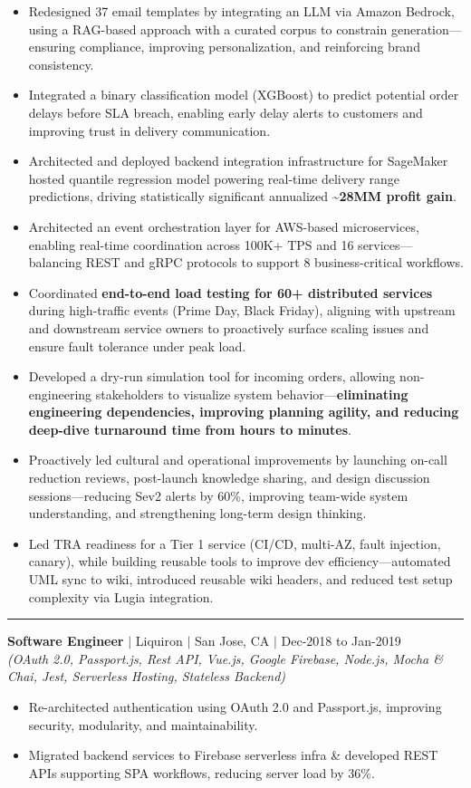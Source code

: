 \documentclass[10pt,letterpaper]{article}
\newcommand{\resumeItem}[1]{\item \small{#1}}
\newcommand{\role}[4]{
  \vspace{1.5pt}
  \textbf{#1} $|$ #2 $|$ #3 $|$ #4\\[-2pt]
}
\newcommand{\tech}[1]{\small\textit{(#1)}\vspace{1.5pt}}
\begin{document}
\begin{itemize}
    \resumeItem{Redesigned 37 email templates by integrating an LLM via Amazon Bedrock, using a RAG-based approach with a curated corpus to constrain generation---ensuring compliance, improving personalization, and reinforcing brand consistency.}
    \resumeItem{Integrated a binary classification model (XGBoost) to predict potential order delays before SLA breach, enabling early delay alerts to customers and improving trust in delivery communication.}
    \resumeItem{Architected and deployed backend integration infrastructure for SageMaker hosted quantile regression model powering real-time delivery range predictions, driving statistically significant annualized \textbf{\textasciitilde{}28MM profit gain}.}
    \resumeItem{Architected an event orchestration layer for AWS-based microservices, enabling real-time coordination across 100K+ TPS and 16 services---balancing REST and gRPC protocols to support 8 business-critical workflows.}
    \resumeItem{Coordinated \textbf{end-to-end load testing for 60+ distributed services} during high-traffic events (Prime Day, Black Friday), aligning with upstream and downstream service owners to proactively surface scaling issues and ensure fault tolerance under peak load.}
    \resumeItem{Developed a dry-run simulation tool for incoming orders, allowing non-engineering stakeholders to visualize system behavior---\textbf{eliminating engineering dependencies, improving planning agility, and reducing deep-dive turnaround time from hours to minutes}.}
    \resumeItem{Proactively led cultural and operational improvements by launching on-call reduction reviews, post-launch knowledge sharing, and design discussion sessions---reducing Sev2 alerts by 60\%, improving team-wide system understanding, and strengthening long-term design thinking.}
    \resumeItem{Led TRA readiness for a Tier 1 service (CI/CD, multi-AZ, fault injection, canary), while building reusable tools to improve dev efficiency---automated UML sync to wiki, introduced reusable wiki headers, and reduced test setup complexity via Lugia integration.}
\end{itemize}

\vspace{2pt}
\hrule
\vspace{2pt}

\role{Software Engineer}{Liquiron}{San Jose, CA}{Dec-2018 to Jan-2019}
\tech{OAuth 2.0, Passport.js, Rest API, Vue.js, Google Firebase, Node.js, Mocha \& Chai, Jest, Serverless Hosting, Stateless Backend}
\begin{itemize}
    \resumeItem{Re-architected authentication using OAuth 2.0 and Passport.js, improving security, modularity, and maintainability.}
    \resumeItem{Migrated backend services to Firebase serverless infra \& developed REST APIs supporting SPA workflows, reducing server load by 36\%.}
\end{itemize}
\end{document}
